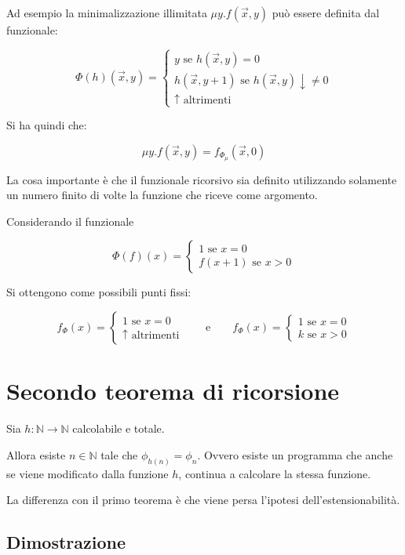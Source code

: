 
Ad esempio la minimalizzazione illimitata $\mu y . f(\vec{x}, y)$ può essere definita dal funzionale:

$$
\Phi(h)(\vec{x},y) = \begin{cases}
	y \text{ se } h(\vec{x},y) = 0 \\
	h(\vec{x}, y+1) \text{ se } h(\vec{x},y)\downarrow \neq 0\\
	\uparrow \text{  altrimenti}
\end{cases}
$$

Si ha quindi che:

$$
\mu y . f(\vec{x},y) = f_{\Phi_\mu}(\vec{x},0)
$$

La cosa importante è che il funzionale ricorsivo sia definito utilizzando solamente un numero finito di volte la funzione che riceve come argomento.

Considerando il funzionale

$$
\Phi(f)(x) = \begin{cases}
	1 \text{ se } x =0\\
	f(x+1) \text{ se } x > 0
\end{cases}
$$

Si ottengono come possibili punti fissi:

$$
f_\Phi(x) = \begin{cases}
	1 \text{ se } x = 0 \\
	\uparrow \text{ altrimenti}
\end{cases}  \qquad \text{e} \qquad f_\Phi(x) = \begin{cases}
	1 \text{ se } x =0 \\
	k \text{ se } x > 0
\end{cases}
$$

\section{Secondo teorema di ricorsione} 

Sia $h : \mathbb{N} \rightarrow \mathbb{N}$ calcolabile e totale.

Allora esiste $n \in \mathbb{N}$ tale che $\phi_{h(n)} = \phi_n$. Ovvero esiste un programma che anche se viene modificato dalla funzione $h$, continua a calcolare la stessa funzione.

La differenza con il primo teorema è che viene persa l'ipotesi dell'estensionabilità.

\subsection{Dimostrazione}

